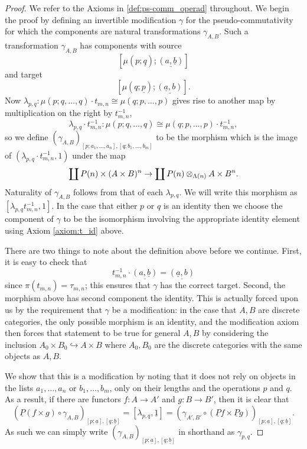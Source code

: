 \begin{proof}
We refer to the Axioms in \cref{def:ps-comm_operad} throughout. We begin the proof by defining an invertible modification $\gamma$ for the pseudo-commutativity for which the components are natural transformations $\gamma_{A,B}$. Such a transformation $\gamma_{A,B}$ has components with source
  \[
    \left[\mu\left(p; \underline{q}\right); \underline{(a, \underline{b})}\right]
  \]
and target
  \[
    \left[\mu\left(q; \underline{p}\right); \underline{(\underline{a},b)}\right].
  \]
Now $ \lambda_{p,q} \colon \mu(p;q,\ldots,q) \cdot t_{m,n} \cong \mu(q;p,\ldots,p)$ gives rise to another map by multiplication on the right by $t_{m,n}^{-1}$,
  \[
    \lambda_{p,q}\cdot t_{m,n}^{-1} \colon \mu(p;q,\ldots,q) \cong \mu(q;p,\ldots,p) \cdot t_{m,n}^{-1},
  \]
so we define $(\gamma_{A,B})_{[p;a_1,\ldots,a_n],[q;b_1,\ldots,b_m]}$ to be the morphism which is the image of $(\lambda_{p,q}\cdot t_{m,n}^{-1}, 1)$ under the map
  \[
    \coprod P(n) \times (A \times B)^{n} \rightarrow \coprod P(n) \otimes_{\Lambda(n)} A \times B^{n}.
  \]
Naturality of $\gamma_{A,B}$ follows from that of each $\lambda_{p,q}$. We will write this morphism as $[\lambda_{p,q}t_{m,n}^{-1}, 1]$. In the case that either $p$ or $q$ is an identity then we choose the component of $\gamma$ to be the isomorphism involving the appropriate identity element using Axiom \ref{axiom:t_id} above.

There are two things to note about the definition above before we continue. First, it is easy to check that
  \[
    t_{m,n}^{-1} \cdot \underline{\left(a, \underline{b}\right)} = \underline{\left(\underline{a},b\right)}
  \]
since $\pi(t_{m,n}) = \tau_{m,n}$; this ensures that $\gamma$ has the correct target. Second, the morphism above has second component the identity. This is actually forced upon us by the requirement that $\gamma$ be a modification:  in the case that $A,B$ are discrete categories, the only possible morphism is an identity, and the modification axiom then forces that statement to be true for general $A,B$ by considering the inclusion $A_{0} \times B_{0} \hookrightarrow A \times B$ where $A_{0}, B_{0}$ are the discrete categories with the same objects as $A, B$.

We show that this is a modification by noting that it does not rely on objects in the lists $a_1, \ldots, a_n$ or $b_1, \ldots, b_m$, only on their lengths and the operations $p$ and $q$. As a result, if there are functors $f \colon A \rightarrow A'$ and $g \colon B \rightarrow B'$, then it is clear that
    \[
        (\underline{P}(f\times g) \circ \gamma_{A,B})_{\left[p;\underline{a}\right],\left[q;\underline{b}\right]} = [\lambda_{p,q},\underline{1}] = (\gamma_{A',B'} \circ (\underline{P}f\times \underline{P}g))_{\left[p;\underline{a}\right],\left[q;\underline{b}\right]}.
    \]
As such we can simply write $(\gamma_{A,B})_{[p;\underline{a}],[q;\underline{b}]}$ in shorthand as $\gamma_{p,q}$.


\end{proof}
